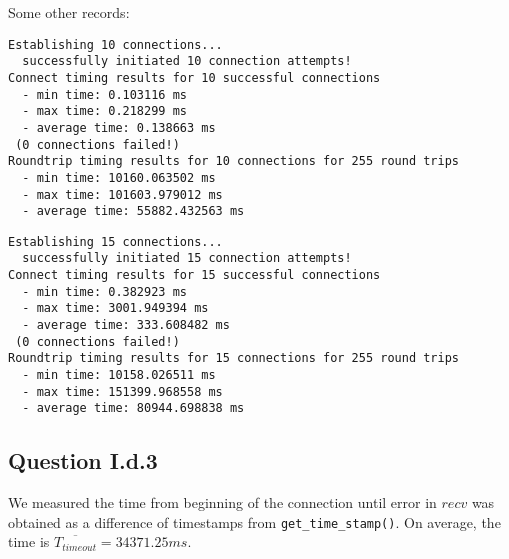 Some other records:
\begin{verbatim}
Establishing 10 connections... 
  successfully initiated 10 connection attempts!
Connect timing results for 10 successful connections
  - min time: 0.103116 ms
  - max time: 0.218299 ms
  - average time: 0.138663 ms
 (0 connections failed!)
Roundtrip timing results for 10 connections for 255 round trips
  - min time: 10160.063502 ms
  - max time: 101603.979012 ms
  - average time: 55882.432563 ms
\end{verbatim}

\begin{verbatim}
Establishing 15 connections... 
  successfully initiated 15 connection attempts!
Connect timing results for 15 successful connections
  - min time: 0.382923 ms
  - max time: 3001.949394 ms
  - average time: 333.608482 ms
 (0 connections failed!)
Roundtrip timing results for 15 connections for 255 round trips
  - min time: 10158.026511 ms
  - max time: 151399.968558 ms
  - average time: 80944.698838 ms
\end{verbatim}

\subsection*{Question I.d.3}
We measured the time from beginning of the connection until error in $recv$ was obtained as a difference of timestamps from \texttt{get\_time\_stamp()}. On average, the time is $\overline{T_{timeout}}=34371.25 ms$.



